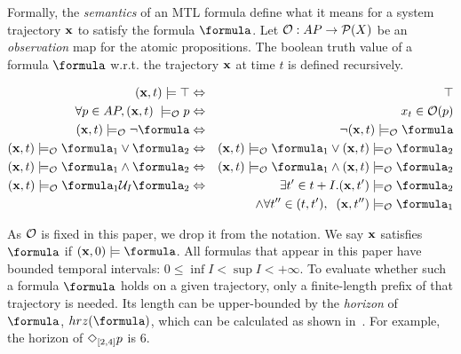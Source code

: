 Formally, the \textit{semantics} of an MTL formula define what it means for a system trajectory $\mathbf{x}$ to satisfy the formula $\formula$.
Let $\mathcal{O}: AP \rightarrow \mathcal{P}(X)$ be an \textit{observation} map for the atomic propositions.
The boolean truth value of a formula $\formula$ w.r.t. the trajectory $\mathbf{x}$ at time $t$ is defined recursively.
\begin{definition}
	\label{def:boolean sat}
	\begin{eqnarray*}
		\label{eq:boolean sat}
		(\sstraj,t) \models \top &\Leftrightarrow& \top
		\\
		\forall p \in AP, (\sstraj, t) \; \models_\Oc p &\Leftrightarrow& x_t \in \Oc(p)
		\\
		(\sstraj,t) \models_\Oc \neg \formula&\Leftrightarrow& \neg (\sstraj,t) \models_\Oc \formula
		\\
		(\sstraj,t) \models_\Oc \formula_1 \lor \formula_2 &\Leftrightarrow& (\sstraj,t) \models_\Oc \formula_1 \lor (\sstraj,t) \models_\Oc \formula_2
		\\
		(\sstraj,t) \models_\Oc  \formula_1 \land \formula_2&\Leftrightarrow& (\sstraj,t) \models_\Oc \formula_1 \land (\sstraj,t) \models_\Oc \formula_2
		\\
		(\sstraj,t) \models_\Oc \formula_1 \until_I \formula_2 &\Leftrightarrow& \exists t' \in t+I .  (\sstraj,t') \models_\Oc \formula_2  
		\\
		&& \, \land \forall t'' \in (t,t'), \;\; (\sstraj,t'') \models_\Oc \formula_1 
	\end{eqnarray*}
\end{definition}
As $\mathcal{O}$ is fixed in this paper, we drop it from the notation.
We say $\mathbf{x}$ satisfies $\formula$ if $(\sstraj,0) \models \formula$.
All formulas that appear in this paper have bounded temporal intervals: $ 0\leq \inf I < \sup I < +\infty$.
To evaluate whether such a formula $\formula$ holds on a given trajectory, only a finite-length prefix of that trajectory is needed.
Its length can be upper-bounded by the \textit{horizon} of $\formula$, $hrz(\formula)$, which can be calculated as shown in~\cite{Dokhanchi14_OnlineMonitoring}. 
For example, the horizon of $\Diamond_{[2,4]}p$ is 6.

